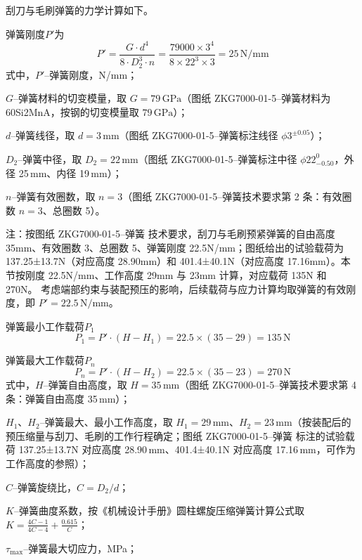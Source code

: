 刮刀与毛刷弹簧的力学计算如下。


弹簧刚度$P'$为
\begin{equation}
    P' = \frac{G \cdot d^4}{8 \cdot D_2^3 \cdot n} = \frac{79000 \times 3^4}{8 \times 22^3 \times 3} = 25 \, \text{N/mm}
\end{equation}
式中，$P'$--弹簧刚度，N/mm；

$G$--弹簧材料的切变模量，取 $G=79\,\text{GPa}$（图纸 ZKG7000-01-5--弹簧材料为 60Si2MnA，按钢的切变模量取 $79\,\text{GPa}$）；

$d$--弹簧线径，取 $d=3\,\text{mm}$（图纸 ZKG7000-01-5--弹簧标注线径 $\phi 3^{\pm0.05}$）；

$D_2$--弹簧中径，取 $D_2=22\,\text{mm}$（图纸 ZKG7000-01-5--弹簧标注中径 $\phi 22_{-0.50}^{0}$，外径 25\,mm、内径 19\,mm）；

$n$--弹簧有效圈数，取 $n=3$（图纸 ZKG7000-01-5--弹簧技术要求第 2 条：有效圈数 $n=3$、总圈数 5）。

注：按图纸 ZKG7000-01-5--弹簧 技术要求，刮刀与毛刷预紧弹簧的自由高度 35mm、有效圈数 3、总圈数 5、弹簧刚度 22.5N/mm；图纸给出的试验载荷为 137.25±13.7N（对应高度 28.90mm）和 401.4±40.1N（对应高度 17.16mm）。本节按刚度 22.5N/mm、工作高度 29mm 与 23mm 计算，对应载荷 135N 和 270N。
考虑端部约束与装配预压的影响，后续载荷与应力计算均取弹簧的有效刚度，即 $P' = 22.5 \, \text{N/mm}$。

弹簧最小工作载荷$P_1$
\begin{equation}
    P_1 = P' \cdot (H - H_1) = 22.5 \times (35 - 29) = 135 \, \text{N}
\end{equation}

弹簧最大工作载荷$P_n$
\begin{equation}
    P_n = P' \cdot (H - H_2) = 22.5 \times (35 - 23) = 270 \, \text{N}
\end{equation}
式中，$H$--弹簧自由高度，取 $H=35\,\text{mm}$（图纸 ZKG7000-01-5--弹簧技术要求第 4 条：弹簧自由高度 35\,mm）；

$H_1$、$H_2$--弹簧最大、最小工作高度，取 $H_1=29\,\text{mm}$、$H_2=23\,\text{mm}$（按装配后的预压缩量与刮刀、毛刷的工作行程确定；图纸 ZKG7000-01-5--弹簧 标注的试验载荷 137.25±13.7N 对应高度 28.90\,mm、401.4±40.1N 对应高度 17.16\,mm，可作为工作高度的参照）；

$C$--弹簧旋绕比，$C=D_2/d$；

$K$--弹簧曲度系数，按《机械设计手册》圆柱螺旋压缩弹簧计算公式\cite{ref26}取 $K = \frac{4C-1}{4C-4} + \frac{0.615}{C}$；

$\tau_{\max}$--弹簧最大切应力，MPa；

